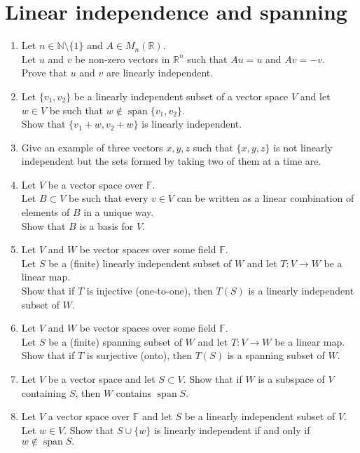 \documentclass[12pt]{article}
\begin{document}
\section{Linear independence and spanning}
\begin{enumerate}[leftmargin=*]
	\item Let $n \in \mathbb{N}\setminus\{1\}$ and $A \in M_n(\mathbb{R}).$ \\
	Let $u$ and $v$ be non-zero vectors in $\mathbb{R}^n$ such that $Au = u$ and $Av = -v.$\\
	Prove that $u$ and $v$ are linearly independent.
	\item Let $\{v_1,v_2\}$ be a linearly independent subset of a vector space $V$ and let $w\in V$ be such that $w \notin\operatorname{span}\{v_1,v_2\}$. \\
	Show that $\{v_1 + w, v_2 + w\}$ is linearly independent.
	\item Give an example of three vectors $x, y, z$ such that $\{x, y, z\}$ is not linearly independent but the sets formed by taking two of them at a time are.
	\item Let $V$ be a vector space over $\mathbb{F}.$\\
	Let $B \subset V$ be such that every $v \in V$ can be written as a linear combination of elements of $B$ in a unique way.\\
	Show that $B$ is a basis for $V.$
	\item Let $V$ and $W$ be vector spaces over some field $\mathbb{F}.$\\
	Let $S$ be a (finite) linearly independent subset of $W$ and let $T:V\to W$ be a linear map.\\
	Show that if $T$ is injective (one-to-one), then $T(S)$ is a linearly independent subset of $W.$
	\item Let $V$ and $W$ be vector spaces over some field $\mathbb{F}.$\\
	Let $S$ be a (finite) spanning subset of $W$ and let $T:V\to W$ be a linear map.\\
	Show that if $T$ is surjective (onto), then $T(S)$ is a spanning subset of $W.$
	\item Let $V$ be a vector space and let $S \subset V.$ Show that if $W$ is a subspace of $V$ containing $S$, then $W$ contains $\operatorname{span} S.$
	\item Let $V$ a vector space over $\mathbb{F}$ and let $S$ be a linearly independent subset of $V.$\\
	Let $w \in V.$ Show that $S \cup \{w\}$ is linearly independent if and only if $w \notin \operatorname{span} S.$

\end{enumerate}
\end{document}
